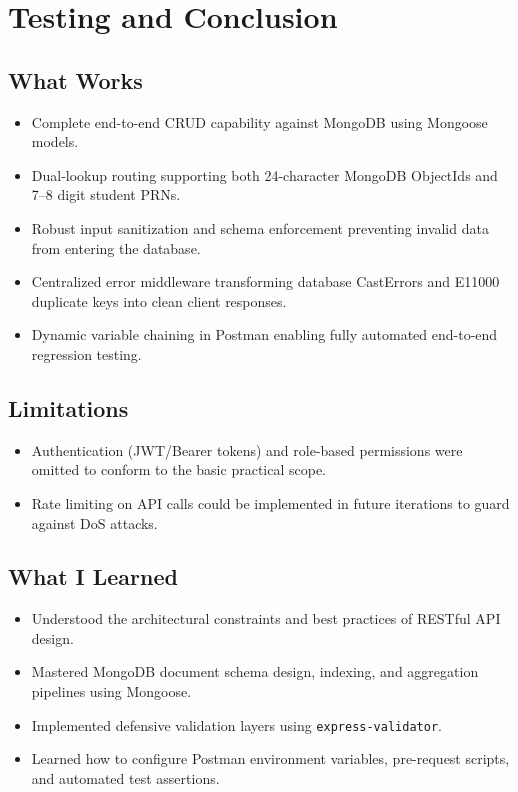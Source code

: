 \documentclass[11pt,a4paper]{article}
\begin{document}
\section{Testing and Conclusion}

\subsection{What Works}
\begin{itemize}
    \item Complete end-to-end CRUD capability against MongoDB using Mongoose models.
    \item Dual-lookup routing supporting both 24-character MongoDB ObjectIds and 7--8 digit student PRNs.
    \item Robust input sanitization and schema enforcement preventing invalid data from entering the database.
    \item Centralized error middleware transforming database CastErrors and E11000 duplicate keys into clean client responses.
    \item Dynamic variable chaining in Postman enabling fully automated end-to-end regression testing.
\end{itemize}

\subsection{Limitations}
\begin{itemize}
    \item Authentication (JWT/Bearer tokens) and role-based permissions were omitted to conform to the basic practical scope.
    \item Rate limiting on API calls could be implemented in future iterations to guard against DoS attacks.
\end{itemize}

\subsection{What I Learned}
\begin{itemize}
    \item Understood the architectural constraints and best practices of RESTful API design.
    \item Mastered MongoDB document schema design, indexing, and aggregation pipelines using Mongoose.
    \item Implemented defensive validation layers using \texttt{express-validator}.
    \item Learned how to configure Postman environment variables, pre-request scripts, and automated test assertions.
\end{itemize}
\end{document}
